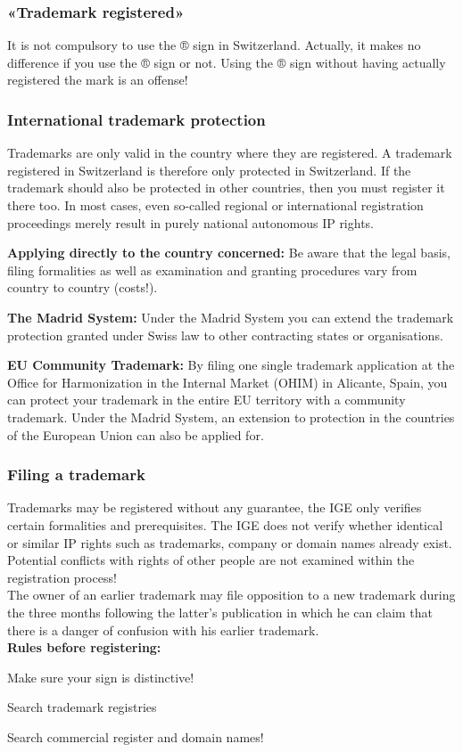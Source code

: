 \subsubsection{«Trademark registered»}
It is not compulsory to use the ® sign in Switzerland. Actually, it makes no difference if you use the ® sign or not. Using the ® sign without having actually registered the mark is an offense!

\subsubsection{International trademark protection}
Trademarks are only valid in the country where they are registered. A trademark registered in Switzerland is therefore only protected in Switzerland. If the trademark should also be protected in other countries, then you must register it there too. In most cases, even so-called regional or international registration proceedings merely result in purely national autonomous IP rights.
\begin{compactitem}
	\item \textbf{Applying directly to the country concerned:} Be aware that the legal basis, filing formalities as well as examination and	granting procedures vary from country to country (costs!).
	\item \textbf{The Madrid System:} Under the Madrid System you can extend the trademark protection granted under Swiss law to other contracting states or organisations.
	\item \textbf{EU Community Trademark:} By filing one single trademark application at the Office for Harmonization in
	the Internal Market (OHIM) in Alicante, Spain, you can protect your trademark in the entire EU territory with a community trademark. Under the Madrid System, an extension to protection in the	countries of the European Union can also be applied for.
\end{compactitem}

\subsubsection{Filing a trademark}
Trademarks may be registered without any guarantee, the IGE only verifies certain formalities and prerequisites. The IGE does not verify whether identical or similar IP rights such as trademarks, company or domain names already exist. Potential conflicts with rights of other people are not examined within the registration process! \\
The owner of an earlier trademark may file opposition to a new trademark during the three months following the latter’s publication in which he can claim that there is a danger of confusion with his earlier trademark. \\
\textbf{Rules before registering:}
\begin{compactitem}
	\item Make sure your sign is distinctive!
	\item Search trademark registries
	\item Search commercial register and domain names!
\end{compactitem}

